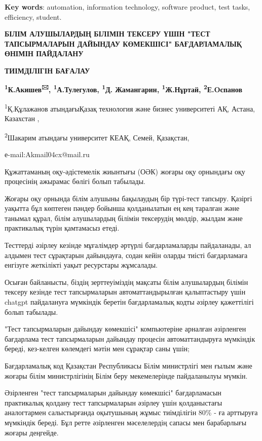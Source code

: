 {\bfseries Key words}: automation, information technology, software
product, test tasks, efficiency, student.

\begin{center}

{\bfseries БІЛІМ АЛУШЫЛАРДЫҢ БІЛІМІН ТЕКСЕРУ ҮШІН "ТЕСТ ТАПСЫРМАЛАРЫН
ДАЙЫНДАУ КӨМЕКШІСІ" БАҒДАРЛАМАЛЫҚ ӨНІМІН ПАЙДАЛАНУ}

{\bfseries ТИІМДІЛІГІН БАҒАЛАУ}

{\bfseries \textsuperscript{1}К.Акишев\textsuperscript{🖂},
\textsuperscript{1}А.Тулегулов, \textsuperscript{1}Д. Жамангарин,
\textsuperscript{1}Ж.Нұртай, \textsuperscript{2}Е.Oспанов}

\textsuperscript{1}Қ.Құлажанов атындағыҚазақ технология және бизнес
университеті АҚ, Астана, Казахстан ,

\textsuperscript{2}Шакарим атындағы университет КЕАҚ, Семей, Қазақстан,

е-mail:Akmail04cx@mail.ru
\end{center}

Құжаттаманың оқу-әдістемелік жиынтығы (ОӘК) жоғары оқу орнындағы оқу
процесінің ажырамас бөлігі болып табылады.

Жоғары оқу орнында білім алушыны бақылаудың бір түрі-тест тапсыру.
Қазіргі уақытта бұл көптеген пәндер бойынша қолданылатын ең кең таралған
және танымал құрал, білім алушылардың білімін тексерудің мөлдір, жылдам
және практикалық түрін қамтамасыз етеді.

Тесттерді әзірлеу кезінде мұғалімдер әртүрлі бағдарламаларды
пайдаланады, ал алдымен тест сұрақтарын дайындауға, содан кейін оларды
тиісті бағдарламаға енгізуге жеткілікті уақыт ресурстары жұмсалады.

Осыған байланысты, біздің зерттеуіміздің мақсаты білім алушылардың
білімін тексеру кезінде тест тапсырмаларын автоматтандырылған
қалыптастыру үшін chatgpt пайдалануға мүмкіндік беретін бағдарламалық
кодты әзірлеу қажеттілігі болып табылады.

"Тест тапсырмаларын дайындау көмекшісі" компьютеріне арналған әзірленген
бағдарлама тест тапсырмаларын дайындау процесін автоматтандыруға
мүмкіндік береді, кез-келген көлемдегі мәтін мен сұрақтар саны үшін;

Бағдарламалық код Қазақстан Республикасы Білім министрлігі мен ғылым
және жоғары білім министрлігінің Білім беру мекемелерінде пайдаланылуы
мүмкін.

Әзірленген "тест тапсырмаларын дайындау көмекшісі" бағдарламасын
практикалық қолдану тест тапсырмаларын әзірлеу үшін қолданыстағы
аналогтармен салыстырғанда оқытушының жұмыс тиімділігін 80\% - ға
арттыруға мүмкіндік береді. Бұл ретте әзірленген мәселелердің сапасы мен
барабарлығы жоғары деңгейде.

